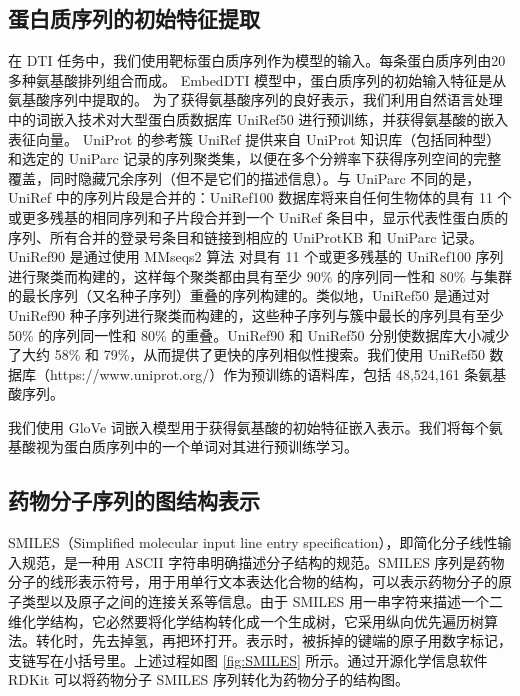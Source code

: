 \subsection{蛋白质序列的初始特征提取}
在 DTI 任务中，我们使用靶标蛋白质序列作为模型的输入。每条蛋白质序列由20多种氨基酸排列组合而成。 EmbedDTI 模型中，蛋白质序列的初始输入特征是从氨基酸序列中提取的。 为了获得氨基酸序列的良好表示，我们利用自然语言处理中的词嵌入技术对大型蛋白质数据库 UniRef50 进行预训练，并获得氨基酸的嵌入表征向量。 UniProt 的参考簇 UniRef 提供来自 UniProt 知识库（包括同种型）和选定的 UniParc 记录的序列聚类集，以便在多个分辨率下获得序列空间的完整覆盖，同时隐藏冗余序列（但不是它们的描述信息）。与 UniParc 不同的是，UniRef 中的序列片段是合并的：UniRef100 数据库将来自任何生物体的具有 11 个或更多残基的相同序列和子片段合并到一个 UniRef 条目中，显示代表性蛋白质的序列、所有合并的登录号条目和链接到相应的 UniProtKB 和 UniParc 记录。 UniRef90 是通过使用 MMseqs2 算法 \cite{steinegger2017mmseqs2} 对具有 11 个或更多残基的 UniRef100 序列进行聚类而构建的，这样每个聚类都由具有至少 90\% 的序列同一性和 80\% 与集群的最长序列（又名种子序列）重叠的序列构建的。类似地，UniRef50 是通过对 UniRef90 种子序列进行聚类而构建的，这些种子序列与簇中最长的序列具有至少 50\% 的序列同一性和 80\% 的重叠。UniRef90 和 UniRef50 分别使数据库大小减少了大约 58\% 和 79\%，从而提供了更快的序列相似性搜索。我们使用 UniRef50 数据库（https://www.uniprot.org/）作为预训练的语料库，包括 48,524,161 条氨基酸序列。

我们使用 GloVe \cite{pennington2014glove} 词嵌入模型用于获得氨基酸的初始特征嵌入表示。我们将每个氨基酸视为蛋白质序列中的一个单词对其进行预训练学习。

\subsection{药物分子序列的图结构表示}
SMILES（Simplified molecular input line entry specification）\cite{weininger1988smiles}，即简化分子线性输入规范，是一种用 ASCII 字符串明确描述分子结构的规范。SMILES 序列是药物分子的线形表示符号，用于用单行文本表达化合物的结构，可以表示药物分子的原子类型以及原子之间的连接关系等信息。由于 SMILES 用一串字符来描述一个二维化学结构，它必然要将化学结构转化成一个生成树，它采用纵向优先遍历树算法。转化时，先去掉氢，再把环打开。表示时，被拆掉的键端的原子用数字标记，支链写在小括号里。上述过程如图 \ref{fig:SMILES} 所示。通过开源化学信息软件 RDKit 可以将药物分子 SMILES 序列转化为药物分子的结构图。



